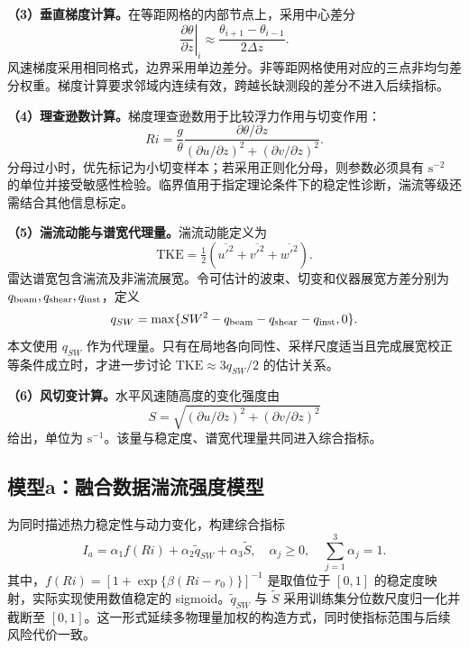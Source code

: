 \textbf{（3）垂直梯度计算。}在等距网格的内部节点上，采用中心差分
\begin{equation}
\left.\frac{\partial\theta}{\partial z}\right|_i\approx
\frac{\theta_{i+1}-\theta_{i-1}}{2\Delta z}.
\end{equation}
风速梯度采用相同格式，边界采用单边差分。非等距网格使用对应的三点非均匀差分权重。梯度计算要求邻域内连续有效，跨越长缺测段的差分不进入后续指标。

\textbf{（4）理查逊数计算。}梯度理查逊数用于比较浮力作用与切变作用：
\begin{equation}\label{eq:ri}
Ri=\frac{g}{\theta}\frac{\partial\theta/\partial z}
{(\partial u/\partial z)^2+(\partial v/\partial z)^2}.
\end{equation}
分母过小时，优先标记为小切变样本；若采用正则化分母，则参数必须具有 $\mathrm{s}^{-2}$ 的单位并接受敏感性检验。临界值用于指定理论条件下的稳定性诊断，湍流等级还需结合其他信息标定。

\textbf{（5）湍流动能与谱宽代理量。}湍流动能定义为
\begin{equation}
\mathrm{TKE}=\tfrac12\left(\overline{u'^2}+\overline{v'^2}+\overline{w'^2}\right).
\end{equation}
雷达谱宽包含湍流及非湍流展宽。令可估计的波束、切变和仪器展宽方差分别为 $q_{\rm beam},q_{\rm shear},q_{\rm inst}$，定义
\begin{equation}
q_{SW}=\max\{SW^2-q_{\rm beam}-q_{\rm shear}-q_{\rm inst},0\}.
\end{equation}
本文使用 $q_{SW}$ 作为代理量。只有在局地各向同性、采样尺度适当且完成展宽校正等条件成立时，才进一步讨论 $\mathrm{TKE}\approx3q_{SW}/2$ 的估计关系。

\textbf{（6）风切变计算。}水平风速随高度的变化强度由
\begin{equation}
S=\sqrt{(\partial u/\partial z)^2+(\partial v/\partial z)^2}
\end{equation}
给出，单位为 $\mathrm{s}^{-1}$。该量与稳定度、谱宽代理量共同进入综合指标。
\subsection{模型a：融合数据湍流强度模型}
为同时描述热力稳定性与动力变化，构建综合指标
\begin{equation}\label{eq:modela}
I_a=\alpha_1f(Ri)+\alpha_2\widetilde q_{SW}+\alpha_3\widetilde S,
\quad \alpha_j\ge0,\quad\sum_{j=1}^{3}\alpha_j=1.
\end{equation}
其中，$f(Ri)=[1+\exp\{\beta(Ri-r_0)\}]^{-1}$ 是取值位于 $[0,1]$ 的稳定度映射，实际实现使用数值稳定的 sigmoid。$\widetilde q_{SW}$ 与 $\widetilde S$ 采用训练集分位数尺度归一化并截断至 $[0,1]$。这一形式延续多物理量加权的构造方式，同时使指标范围与后续风险代价一致。

